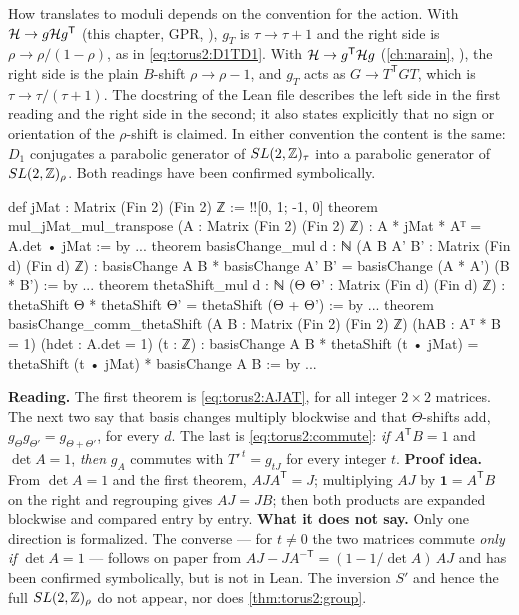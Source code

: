 \begin{pitfallbox}
How  translates to moduli depends on the convention for
the action. With $\mathcal{H}\to g\mathcal{H} g^{\mathsf T}$ (this chapter, GPR, ),
$g_T$ is $\tau\to\tau+1$ and the right side is $\rho\to\rho/(1-\rho)$, as in
\eqref{eq:torus2:D1TD1}. With $\mathcal{H}\to g^{\mathsf T}\mathcal{H} g$ (\cref{ch:narain},
), the right side is the plain $B$-shift $\rho\to\rho-1$, and
$g_T$ acts as $G\to T^{\mathsf T}GT$, which is $\tau\to\tau/(\tau+1)$. The docstring of the
Lean file describes the left side in the first reading and the right side in the second; it
also states explicitly that no sign or orientation of the $\rho$-shift is claimed. In
either convention the content is the same: $D_1$ conjugates a parabolic generator of
$SL(2,\mathbb{Z})_\tau$ into a parabolic generator of $SL(2,\mathbb{Z})_\rho$. Both readings have been
confirmed symbolically.
\end{pitfallbox}

\begin{leanbox}
\begin{leancode}
def jMat : Matrix (Fin 2) (Fin 2) ℤ := !![0, 1; -1, 0]
theorem mul_jMat_mul_transpose (A : Matrix (Fin 2) (Fin 2) ℤ) :
    A * jMat * Aᵀ = A.det • jMat := by ...
theorem basisChange_mul {d : ℕ} (A B A' B' : Matrix (Fin d) (Fin d) ℤ) :
    basisChange A B * basisChange A' B' = basisChange (A * A') (B * B') := by ...
theorem thetaShift_mul {d : ℕ} (Θ Θ' : Matrix (Fin d) (Fin d) ℤ) :
    thetaShift Θ * thetaShift Θ' = thetaShift (Θ + Θ') := by ...
theorem basisChange_comm_thetaShift (A B : Matrix (Fin 2) (Fin 2) ℤ)
    (hAB : Aᵀ * B = 1) (hdet : A.det = 1) (t : ℤ) :
    basisChange A B * thetaShift (t • jMat) =
      thetaShift (t • jMat) * basisChange A B := by ...
\end{leancode}
\textbf{Reading.} The first theorem is \eqref{eq:torus2:AJAT}, for all integer $2\times2$
matrices. The next two say that basis changes multiply blockwise and that $\Theta$-shifts
add, $g_\Theta g_{\Theta'}=g_{\Theta+\Theta'}$, for every $d$. The last is
\eqref{eq:torus2:commute}: \emph{if} $A^{\mathsf T}B=1$ and $\det A=1$, \emph{then}
$g_A$ commutes with $T'^{\,t}=g_{tJ}$ for every integer $t$. \textbf{Proof idea.} From
$\det A=1$ and the first theorem, $AJA^{\mathsf T}=J$; multiplying $AJ$ by
$\mathbf 1=A^{\mathsf T}B$ on the right and regrouping gives $AJ=JB$; then both products
are expanded blockwise and compared entry by entry. \textbf{What it does not say.} Only
one direction is formalized. The converse --- for $t\ne0$ the two matrices commute
\emph{only if} $\det A=1$ --- follows on paper from
$AJ-JA^{-\mathsf T}=(1-1/\det A)\,AJ$ and has been confirmed symbolically, but is not in
Lean. The inversion $S'$ and hence the full $SL(2,\mathbb{Z})_\rho$ do not appear, nor does
\cref{thm:torus2:group}.
\end{leanbox}

